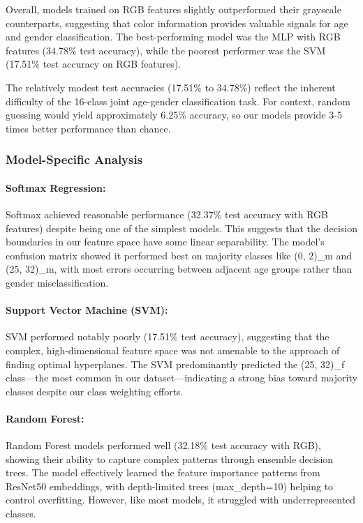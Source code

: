 \documentclass{article}
\begin{document}
Overall, models trained on RGB features slightly outperformed their grayscale counterparts, suggesting that color information provides valuable signals for age and gender classification. The best-performing model was the MLP with RGB features (34.78\% test accuracy), while the poorest performer was the SVM (17.51\% test accuracy on RGB features).

The relatively modest test accuracies (17.51\% to 34.78\%) reflect the inherent difficulty of the 16-class joint age-gender classification task. For context, random guessing would yield approximately 6.25\% accuracy, so our models provide 3-5 times better performance than chance.

\subsubsection{Model-Specific Analysis}

\paragraph{Softmax Regression:} 
Softmax achieved reasonable performance (32.37\% test accuracy with RGB features) despite being one of the simplest models. This suggests that the decision boundaries in our feature space have some linear separability. The model's confusion matrix showed it performed best on majority classes like (0, 2)\_m and (25, 32)\_m, with most errors occurring between adjacent age groups rather than gender misclassification.

\paragraph{Support Vector Machine (SVM):}
SVM performed notably poorly (17.51\% test accuracy), suggesting that the complex, high-dimensional feature space was not amenable to the approach of finding optimal hyperplanes. The SVM predominantly predicted the (25, 32)\_f class—the most common in our dataset—indicating a strong bias toward majority classes despite our class weighting efforts.

\paragraph{Random Forest:}
Random Forest models performed well (32.18\% test accuracy with RGB), showing their ability to capture complex patterns through ensemble decision trees. The model effectively learned the feature importance patterns from ResNet50 embeddings, with depth-limited trees (max\_depth=10) helping to control overfitting. However, like most models, it struggled with underrepresented classes.
\end{document}
